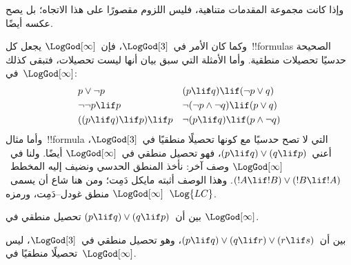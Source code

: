 \documentclass[../../../include/open-logic-section]{subfiles}
\begin{document}
وإذا كانت مجموعة المقدمات متناهية، فليس اللزوم مقصورًا على هذا الاتجاه؛
بل يصح عكسه أيضًا.

وكما كان الأمر في~$\LogGod[3]$، فإن~$\LogGod[\infty]$ يجعل كل~!!{formula}s الصحيحة
حدسيًا تحصيلات منطقية. وأما الأمثلة التي سبق بيان أنها ليست تحصيلات،
فتبقى كذلك في~$\LogGod[\infty]$:
\begin{align*}
  & p \lor \lnot p && (p \lif q) \lif (\lnot p \lor q) \\
  & \lnot\lnot p \lif p && \lnot(\lnot p \land \lnot q) \lif (p \lor q) \\
  & ((p \lif q) \lif p) \lif p && \lnot(p \lif q) \lif (p \land \lnot q)
\end{align*}
وأما مثال~!!{formula} التي لا تصح حدسيًا مع كونها تحصيلًا منطقيًا
في~$\LogGod[3]$، أعني~$(p \lif q) \lor (q \lif p)$، فهو تحصيل منطقي
في~$\LogGod[\infty]$ أيضًا. ولنا في~$\LogGod[\infty]$ وصف آخر:
نأخذ المنطق الحدسي ونضيف إليه المخطط~$(!A \lif !B) \lor (!B \lif !A)$.
وهذا الوصف أثبته مايكل دَمِت؛ ومن هنا شاع أن يسمى~$\LogGod[\infty]$
منطق غودل--دَمِت، ورمزه~$\Log{LC}$.

\begin{prob}
  بين أن~$(p \lif q) \lor (q \lif p)$ تحصيل منطقي في
  $\LogGod[\infty]$.
\end{prob}

\begin{prob}
  بين أن~$(p \lif q) \lor (q \lif r) \lor (r \lif s)$، وهو تحصيل
  منطقي في~$\LogGod[3]$، ليس تحصيلًا منطقيًا في~$\LogGod[\infty]$.
\end{prob}
\end{document}
